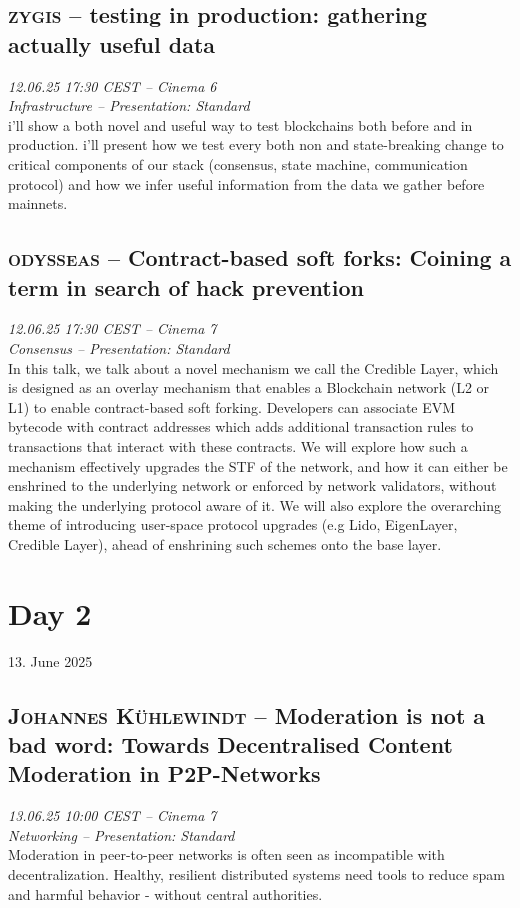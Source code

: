 \clearpage
\subsection {\textsc{zygis}  -- testing in production: gathering actually useful data} \noindent \textit {12.06.25 17:30 CEST -- Cinema 6\\ Infrastructure -- Presentation: Standard}\\[1em] i'll show a both novel and useful way to test blockchains both before and in production. i'll present how we test every both non and state-breaking change to critical components of our stack (consensus, state machine, communication protocol) and how we infer useful information from the data we gather before mainnets.

\clearpage
\subsection {\textsc{odysseas}  -- Contract-based soft forks: Coining a term in search of hack prevention} \noindent \textit {12.06.25 17:30 CEST -- Cinema 7\\ Consensus -- Presentation: Standard}\\[1em] In this talk, we talk about a novel mechanism we call the Credible Layer, which is designed as an overlay mechanism that enables a Blockchain network (L2 or L1) to enable contract-based soft forking. Developers can associate EVM bytecode with contract addresses which adds additional transaction rules  to transactions that interact with these contracts. We will explore how such a mechanism effectively upgrades the STF of the network, and how it can either be enshrined to the underlying network or enforced by network validators, without making the underlying protocol aware of it. We will also explore the overarching theme of introducing user-space protocol upgrades (e.g Lido, EigenLayer, Credible Layer), ahead of enshrining such schemes onto the base layer.

\clearpage
\section {Day 2} 13. June 2025\cleardoublepage
\subsection {\textsc{Johannes Kühlewindt}  -- Moderation is not a bad word: Towards Decentralised Content Moderation in P2P-Networks} \noindent \textit {13.06.25 10:00 CEST -- Cinema 7\\ Networking -- Presentation: Standard}\\[1em] Moderation in peer-to-peer networks is often seen as incompatible with decentralization. Healthy, resilient distributed systems need tools to reduce spam and harmful behavior - without central authorities.

